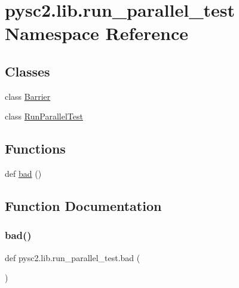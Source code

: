 \hypertarget{namespacepysc2_1_1lib_1_1run__parallel__test}{}\section{pysc2.\+lib.\+run\+\_\+parallel\+\_\+test Namespace Reference}
\label{namespacepysc2_1_1lib_1_1run__parallel__test}
\subsection*{Classes}
\begin{DoxyCompactItemize}
\item 
class \mbox{\hyperlink{classpysc2_1_1lib_1_1run__parallel__test_1_1_barrier}{Barrier}}
\item 
class \mbox{\hyperlink{classpysc2_1_1lib_1_1run__parallel__test_1_1_run_parallel_test}{Run\+Parallel\+Test}}
\end{DoxyCompactItemize}
\subsection*{Functions}
\begin{DoxyCompactItemize}
\item 
def \mbox{\hyperlink{namespacepysc2_1_1lib_1_1run__parallel__test_ae7dde1edcb45cf14df1fd863e91f2080}{bad}} ()
\end{DoxyCompactItemize}


\subsection{Function Documentation}
\mbox{\label{namespacepysc2_1_1lib_1_1run__parallel__test_ae7dde1edcb45cf14df1fd863e91f2080}} 
\subsubsection{\texorpdfstring{bad()}{bad()}}
{\footnotesize\ttfamily def pysc2.\+lib.\+run\+\_\+parallel\+\_\+test.\+bad (\begin{DoxyParamCaption}{ }\end{DoxyParamCaption})}

